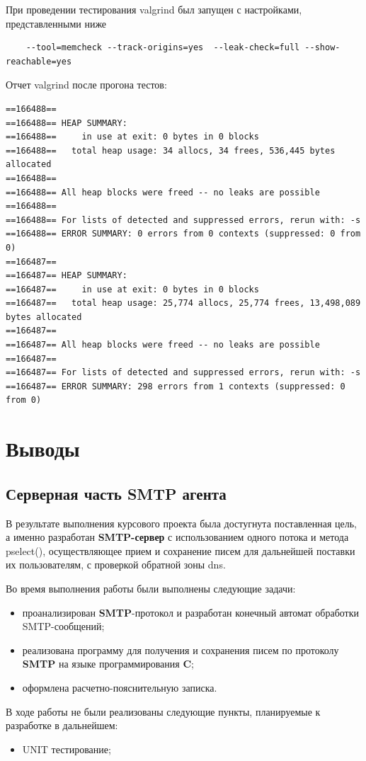 \documentclass[a4paper,12pt]{report}
\begin{document}
При проведении тестирования valgrind был запущен с настройками, представленными ниже
\begin{verbatim}
    --tool=memcheck --track-origins=yes  --leak-check=full --show-reachable=yes
\end{verbatim}

Отчет valgrind после прогона тестов:
\begin{verbatim}
==166488== 
==166488== HEAP SUMMARY:
==166488==     in use at exit: 0 bytes in 0 blocks
==166488==   total heap usage: 34 allocs, 34 frees, 536,445 bytes allocated
==166488== 
==166488== All heap blocks were freed -- no leaks are possible
==166488== 
==166488== For lists of detected and suppressed errors, rerun with: -s
==166488== ERROR SUMMARY: 0 errors from 0 contexts (suppressed: 0 from 0)
==166487== 
==166487== HEAP SUMMARY:
==166487==     in use at exit: 0 bytes in 0 blocks
==166487==   total heap usage: 25,774 allocs, 25,774 frees, 13,498,089 bytes allocated
==166487== 
==166487== All heap blocks were freed -- no leaks are possible
==166487== 
==166487== For lists of detected and suppressed errors, rerun with: -s
==166487== ERROR SUMMARY: 298 errors from 1 contexts (suppressed: 0 from 0)
\end{verbatim}





\chapter*{Выводы}

\section{Серверная часть SMTP агента}

В результате выполнения курсового проекта была достугнута поставленная цель, а именно разработан
\textbf{SMTP-сервер} с использованием одного потока и метода pselect(), осуществляющее прием и сохранение писем
для дальнейшей поставки их пользователям, с проверкой обратной зоны dns.

Во время выполнения работы были выполнены следующие задачи:
\begin{itemize}
    \item проанализирован \textbf{SMTP}-протокол и разработан конечный автомат обработки SMTP-сообщений;
    \item реализована программу для получения и сохранения писем по протоколу \textbf{SMTP} на языке программирования \textbf{C};
    \item оформлена расчетно-пояснительную записка.
\end{itemize}
В ходе работы не были реализованы следующие пункты, планируемые к разработке в дальнейшем:
\begin{itemize}
    \item UNIT тестирование;
\end{itemize}
\end{document}
